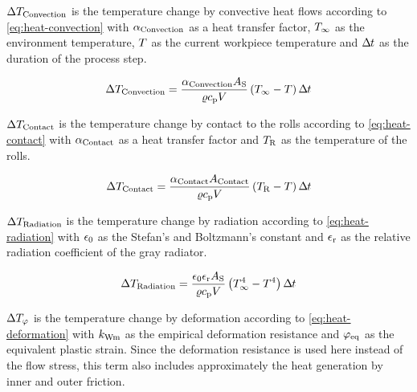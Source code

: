 \noindent$\Delta T_\mathrm{Convection}$ is the temperature change by convective heat flows according to \autoref{eq:heat-convection} with $\alpha_\mathrm{Convection}$ as a heat transfer factor, $T_\infty$ as the environment temperature, $T$ as the current workpiece temperature and $\Delta\mspace{-1mu}t$ as the duration of the process step.

\begin{equation}
    \Delta T_\mathrm{Convection} = \frac{\alpha_\mathrm{Convection} A_\mathrm{S}}{\varrho c_\mathrm{p}V} \left( T_\infty - T \right) \Delta\mspace{-1mu}t
    \label{eq:heat-convection}
\end{equation}

\noindent$\Delta T_\mathrm{Contact}$ is the temperature change by contact to the rolls according to \autoref{eq:heat-contact} with $\alpha_\mathrm{Contact}$ as a heat transfer factor and $T_\mathrm{R}$ as the temperature of the rolls.

\begin{equation}
    \Delta T_\mathrm{Contact} = \frac{\alpha_\mathrm{Contact} A_\mathrm{Contact}}{\varrho c_\mathrm{p}V} \left( T_\mathrm{R} - T \right) \Delta\mspace{-1mu}t
    \label{eq:heat-contact}
\end{equation}

\noindent$\Delta T_\mathrm{Radiation}$ is the temperature change by radiation according to \autoref{eq:heat-radiation} with $\epsilon_0$ as the Stefan's and Boltzmann's constant and $\epsilon_\mathrm{r}$ as the relative radiation coefficient of the gray radiator.

\begin{equation}
    \Delta T_\mathrm{Radiation} = \frac{\epsilon_0 \epsilon_\mathrm{r} A_\mathrm{S}}{\varrho c_\mathrm{p}V} \left( T_\infty^4 - T^4 \right) \Delta\mspace{-1mu}t
    \label{eq:heat-radiation}
\end{equation}

\noindent$\Delta T_\varphi$ is the temperature change by deformation according to \autoref{eq:heat-deformation} with $k_\mathrm{Wm}$ as the empirical deformation resistance and ${\varphi}_\mathrm{eq}$ as the equivalent plastic strain.
Since the deformation resistance is used here instead of the flow stress, this term also includes approximately the heat generation by inner and outer friction.

